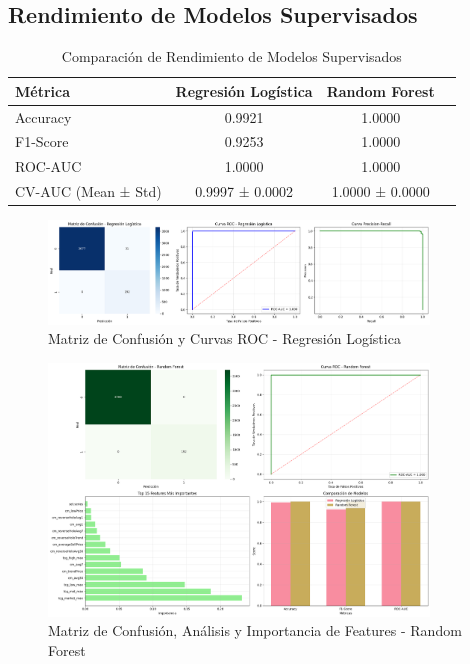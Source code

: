 \documentclass[12pt,letterpaper]{article}
\begin{document}
\subsection{Rendimiento de Modelos Supervisados}

\begin{table}[H]
\centering
\caption{Comparación de Rendimiento de Modelos Supervisados}
\begin{tabular}{@{}lccc@{}}
\toprule
\textbf{Métrica} & \textbf{Regresión Logística} & \textbf{Random Forest} \\
\midrule
Accuracy & 0.9921 & 1.0000 \\
F1-Score & 0.9253 & 1.0000 \\
ROC-AUC & 1.0000 & 1.0000 \\
CV-AUC (Mean ± Std) & 0.9997 ± 0.0002 & 1.0000 ± 0.0000 \\
\bottomrule
\end{tabular}
\label{tab:resultados_modelos}
\end{table}

\begin{figure}[H]
\centering
\includegraphics[width=0.9\textwidth]{imagenes/figura_6_confusion_logistica.png}
\caption{Matriz de Confusión y Curvas ROC - Regresión Logística}
\label{fig:confusion_lr}
\end{figure}

\begin{figure}[H]
\centering
\includegraphics[width=0.9\textwidth]{imagenes/figura_7_confusion_random_forest.png}
\caption{Matriz de Confusión, Análisis y Importancia de Features - Random Forest}
\label{fig:confusion_rf}
\end{figure}
\end{document}
